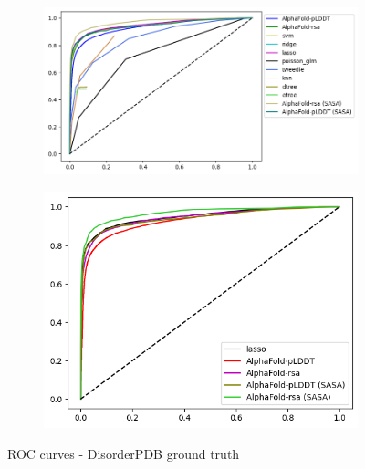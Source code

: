 \begin{figure}[h!]
    \begin{subfigure}{1.1\linewidth}
        \includegraphics[width=\linewidth]{res/ML/roc-disorderpdb-total.png}
    \end{subfigure}
    
    \begin{subfigure}{0.8\linewidth}
        \includegraphics[width=\linewidth]{res/ML/roc-disorderpdb.png}
    \end{subfigure}
    \caption{ROC curves - DisorderPDB ground truth}
\end{figure}

\pagebreak

